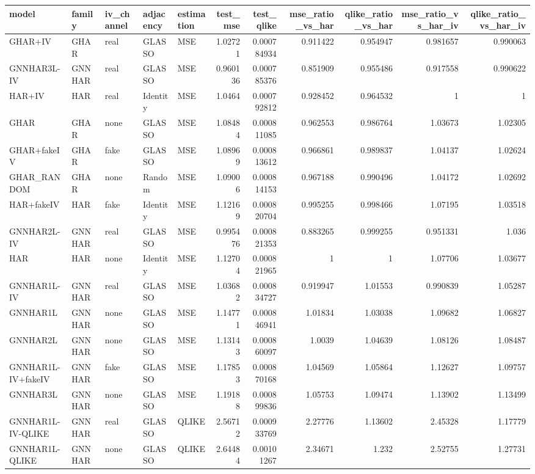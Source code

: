 \begin{tabular}{lllllrrrrrr}
\toprule
model & family & iv_channel & adjacency & estimation & test_mse & test_qlike & mse_ratio_vs_har & qlike_ratio_vs_har & mse_ratio_vs_har_iv & qlike_ratio_vs_har_iv \\
\midrule
GHAR+IV & GHAR & real & GLASSO & MSE & 1.02721 & 0.000784934 & 0.911422 & 0.954947 & 0.981657 & 0.990063 \\
GNNHAR3L-IV & GNNHAR & real & GLASSO & MSE & 0.960136 & 0.000785376 & 0.851909 & 0.955486 & 0.917558 & 0.990622 \\
HAR+IV & HAR & real & Identity & MSE & 1.0464 & 0.000792812 & 0.928452 & 0.964532 & 1 & 1 \\
GHAR & GHAR & none & GLASSO & MSE & 1.08484 & 0.000811085 & 0.962553 & 0.986764 & 1.03673 & 1.02305 \\
GHAR+fakeIV & GHAR & fake & GLASSO & MSE & 1.08969 & 0.000813612 & 0.966861 & 0.989837 & 1.04137 & 1.02624 \\
GHAR_RANDOM & GHAR & none & Random & MSE & 1.09006 & 0.000814153 & 0.967188 & 0.990496 & 1.04172 & 1.02692 \\
HAR+fakeIV & HAR & fake & Identity & MSE & 1.12169 & 0.000820704 & 0.995255 & 0.998466 & 1.07195 & 1.03518 \\
GNNHAR2L-IV & GNNHAR & real & GLASSO & MSE & 0.995476 & 0.000821353 & 0.883265 & 0.999255 & 0.951331 & 1.036 \\
HAR & HAR & none & Identity & MSE & 1.12704 & 0.000821965 & 1 & 1 & 1.07706 & 1.03677 \\
GNNHAR1L-IV & GNNHAR & real & GLASSO & MSE & 1.03682 & 0.000834727 & 0.919947 & 1.01553 & 0.990839 & 1.05287 \\
GNNHAR1L & GNNHAR & none & GLASSO & MSE & 1.14771 & 0.000846941 & 1.01834 & 1.03038 & 1.09682 & 1.06827 \\
GNNHAR2L & GNNHAR & none & GLASSO & MSE & 1.13143 & 0.000860097 & 1.0039 & 1.04639 & 1.08126 & 1.08487 \\
GNNHAR1L-IV+fakeIV & GNNHAR & fake & GLASSO & MSE & 1.17853 & 0.000870168 & 1.04569 & 1.05864 & 1.12627 & 1.09757 \\
GNNHAR3L & GNNHAR & none & GLASSO & MSE & 1.19188 & 0.000899836 & 1.05753 & 1.09474 & 1.13902 & 1.13499 \\
GNNHAR1L-IV-QLIKE & GNNHAR & real & GLASSO & QLIKE & 2.56712 & 0.000933769 & 2.27776 & 1.13602 & 2.45328 & 1.17779 \\
GNNHAR1L-QLIKE & GNNHAR & none & GLASSO & QLIKE & 2.64484 & 0.00101267 & 2.34671 & 1.232 & 2.52755 & 1.27731 \\
\bottomrule
\end{tabular}

